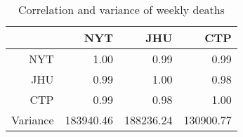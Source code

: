 \begin{table}[ht]
\centering
\begin{tabular}{rrrr}
  \hline
 & NYT & JHU & CTP \\ 
  \hline
NYT & 1.00 & 0.99 & 0.99 \\ 
  JHU & 0.99 & 1.00 & 0.98 \\ 
  CTP & 0.99 & 0.98 & 1.00 \\ 
  Variance & 183940.46 & 188236.24 & 130900.77 \\ 
   \hline
\end{tabular}
\caption{Correlation and variance of weekly deaths\label{tab:weekdeathcor}} 
\end{table}

